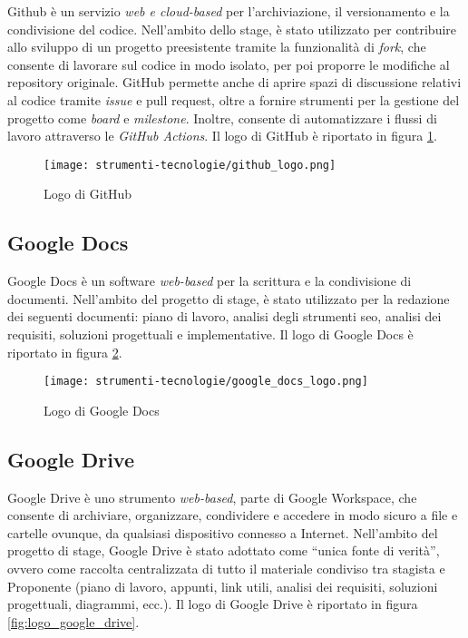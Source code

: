 \par Github è un servizio \textit{web e cloud-based} per l'archiviazione, il versionamento e la condivisione del codice. Nell’ambito dello stage, è stato utilizzato per contribuire allo sviluppo di un progetto preesistente tramite la funzionalità di \textit{fork}, che consente di lavorare sul codice in modo isolato, per poi proporre le modifiche al \gls{repository} originale. GitHub permette anche di aprire spazi di discussione relativi al codice tramite \textit{issue} e \gls{pull request}, oltre a fornire strumenti per la gestione del progetto come \textit{board} e \textit{milestone}. Inoltre, consente di automatizzare i flussi di lavoro attraverso le \textit{GitHub Actions}. Il logo di GitHub è riportato in figura \ref{fig:logo_github}.

\begin{figure}[H]
  \centering 
  \texttt{[image: strumenti-tecnologie/github\_logo.png]} 
  \caption{Logo di GitHub}
  \label{fig:logo_github}
\end{figure}

\subsection*{Google Docs}

\par Google Docs è un software \textit{web-based} per la scrittura e la condivisione di documenti. Nell’ambito del progetto di stage, è stato utilizzato per la redazione dei seguenti documenti: piano di lavoro, analisi degli strumenti \gls{seo}, analisi dei \gls{requisiti}, soluzioni progettuali e implementative. Il logo di Google Docs è riportato in figura \ref{fig:logo_google_docs}.

\begin{figure}[H]
  \centering 
  \texttt{[image: strumenti-tecnologie/google\_docs\_logo.png]} 
  \caption{Logo di Google Docs}
  \label{fig:logo_google_docs}
\end{figure}

\subsection*{Google Drive}

\par Google Drive è uno strumento \textit{web-based}, parte di Google Workspace, che consente di archiviare, organizzare, condividere e accedere in modo sicuro a file e cartelle ovunque, da qualsiasi dispositivo connesso a Internet. Nell’ambito del progetto di stage, Google Drive è stato adottato come “unica fonte di verità”, ovvero come raccolta centralizzata di tutto il materiale condiviso tra stagista e Proponente (piano di lavoro, appunti, link utili, analisi dei \gls{requisiti}, soluzioni progettuali, diagrammi, ecc.). Il logo di Google Drive è riportato in figura \ref{fig:logo_google_drive}.

